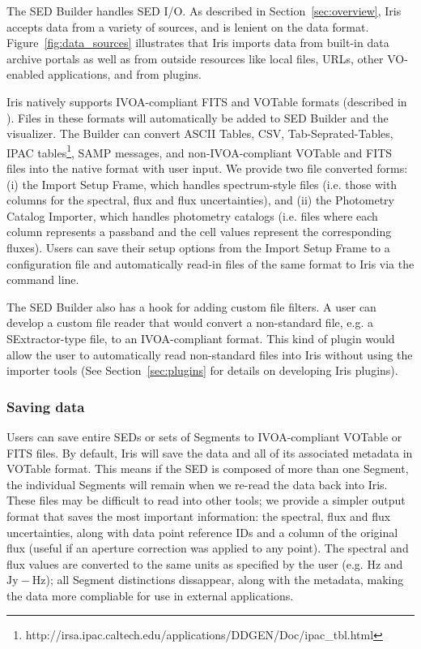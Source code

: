 \documentclass[5p]{elsarticle}
\begin{document}
The SED Builder handles SED I/O. As described in Section~\ref{sec:overview}, Iris accepts data from a variety of sources, and is lenient on the data format. Figure~\ref{fig:data_sources} illustrates that Iris imports data from built-in data archive portals as well as from outside resources like local files, URLs, other VO-enabled applications, and from plugins.

Iris natively supports IVOA-compliant FITS and VOTable formats (described in \cite{2012arXiv1204.3055M}). Files in these formats will automatically be added to SED Builder and the visualizer. The Builder can convert ASCII Tables, CSV, Tab-Seprated-Tables, IPAC tables\footnote{http://irsa.ipac.caltech.edu/applications/DDGEN/Doc/ipac\_tbl.html}, SAMP messages, and non-IVOA-compliant VOTable and FITS files into the native format with user input. We provide two file converted forms: (i) the Import Setup Frame, which handles spectrum-style files (i.e. those with columns for the spectral, flux and flux uncertainties), and (ii) the Photometry Catalog Importer, which handles photometry catalogs (i.e. files where each column represents a passband and the cell values represent the corresponding fluxes). Users can save their setup options from the Import Setup Frame to a configuration file and automatically read-in files of the same format to Iris via the command line.

The SED Builder also has a hook for adding custom file filters. A user can develop a custom file reader that would convert a non-standard file, e.g. a SExtractor-type file, to an IVOA-compliant format. This kind of plugin would allow the user to automatically read non-standard files into Iris without using the importer tools (See Section~\ref{sec:plugins} for details on developing Iris plugins).

\subsubsection{Saving data}
Users can save entire SEDs or sets of Segments to IVOA-compliant VOTable or FITS files. By default, Iris will save the data and all of its associated metadata in VOTable format. This means if the SED is composed of more than one Segment, the individual Segments will remain when we re-read the data back into Iris. These files may be difficult to read into other tools; we provide a simpler output format that saves the most important information: the spectral, flux and flux uncertainties, along with data point reference IDs and a column of the original flux (useful if an aperture correction was applied to any point). The spectral and flux values are converted to the same units as specified by the user (e.g. $\mathrm{Hz}$ and $\mathrm{Jy-Hz}$); all Segment distinctions dissappear, along with the metadata, making the data more compliable for use in external applications.
\end{document}
